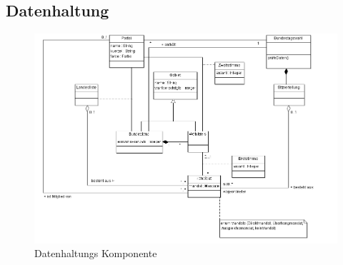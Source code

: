 \documentclass[12pt,a4paper,titlepage]{article}
\begin{document}
\subsection{Datenhaltung}
\begin{figure}[!ht]
\centering
\includegraphics[scale=0.5]{Datenhaltung-Ausschnitt} \caption{Datenhaltungs Komponente} 
\end{figure}
\end{document}
